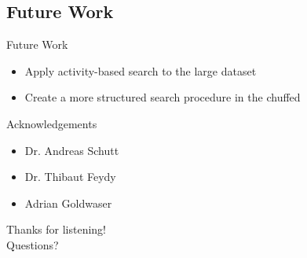 \documentclass{beamer}
\begin{document}
\subsection{Future Work}
\begin{frame}{Future Work}
	\begin{itemize}
		\item Apply activity-based search to the large dataset\pause
		\vspace{2mm}
		\item Create a more structured search procedure in the chuffed
	\end{itemize}
\end{frame}

\begin{frame}{Acknowledgements}
	\begin{itemize}
		\item Dr. Andreas Schutt
		\vspace{2mm}
		\item Dr. Thibaut Feydy
		\vspace{2mm}
		\item Adrian Goldwaser
	\end{itemize}
\end{frame}

\begin{frame}{}
	\centering
	{\Large Thanks for listening!\vspace{1cm}\\
	Questions?}
\end{frame}
\end{document}
